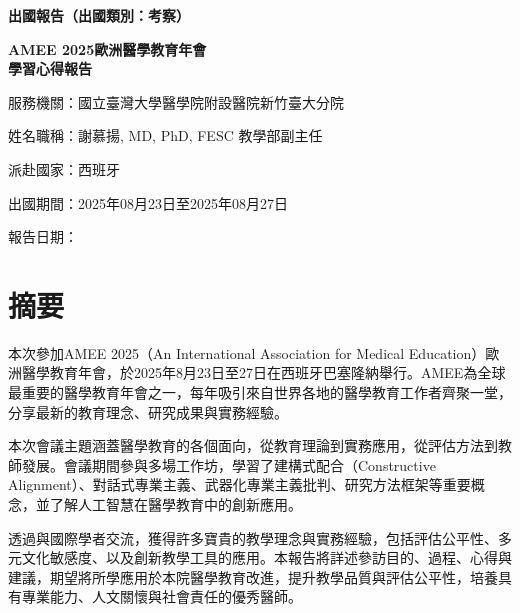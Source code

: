 \documentclass[12pt,a4paper]{article}
\newcommand{\mydate}{\DTMtoday}
\begin{document}
\begin{titlepage}
    {\fontsize{20pt}{24pt}\selectfont\bfseries 出國報告（出國類別：考察）\par}
    
    \vspace{3cm}
    
    \centering
    {\fontsize{26pt}{31pt}\selectfont\bfseries AMEE 2025歐洲醫學教育年會\\學習心得報告\par}
    
    \vspace{4cm}
    
    {\fontsize{14pt}{18pt}\selectfont
    服務機關：國立臺灣大學醫學院附設醫院新竹臺大分院\par
    \vspace{0.3cm}
    姓名職稱：謝慕揚, MD, PhD, FESC 教學部副主任\par
    \vspace{0.3cm}
    派赴國家：西班牙\par
    \vspace{0.3cm}
    出國期間：2025年08月23日至2025年08月27日\par
    \vspace{0.3cm}
    報告日期：\mydate\par
    }
\end{titlepage}

\newpage

\section*{摘要}

本次參加AMEE 2025（An International Association for Medical Education）歐洲醫學教育年會，於2025年8月23日至27日在西班牙巴塞隆納舉行。AMEE為全球最重要的醫學教育年會之一，每年吸引來自世界各地的醫學教育工作者齊聚一堂，分享最新的教育理念、研究成果與實務經驗。

本次會議主題涵蓋醫學教育的各個面向，從教育理論到實務應用，從評估方法到教師發展。會議期間參與多場工作坊，學習了建構式配合（Constructive Alignment）、對話式專業主義、武器化專業主義批判、研究方法框架等重要概念，並了解人工智慧在醫學教育中的創新應用。

透過與國際學者交流，獲得許多寶貴的教學理念與實務經驗，包括評估公平性、多元文化敏感度、以及創新教學工具的應用。本報告將詳述參訪目的、過程、心得與建議，期望將所學應用於本院醫學教育改進，提升教學品質與評估公平性，培養具有專業能力、人文關懷與社會責任的優秀醫師。
\end{document}

